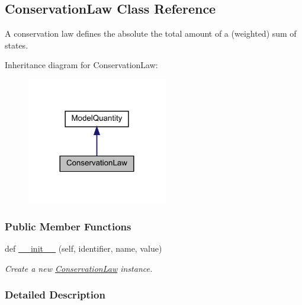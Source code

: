 \hypertarget{classamici_1_1ode__export_1_1_conservation_law}{}\subsection{Conservation\+Law Class Reference}
\label{classamici_1_1ode__export_1_1_conservation_law}


A conservation law defines the absolute the total amount of a (weighted) sum of states.  




Inheritance diagram for Conservation\+Law\+:
\nopagebreak
\begin{figure}[H]
\begin{center}
\leavevmode
\includegraphics[width=173pt]{classamici_1_1ode__export_1_1_conservation_law__inherit__graph}
\end{center}
\end{figure}
\subsubsection*{Public Member Functions}
\begin{DoxyCompactItemize}
\item 
def \mbox{\hyperlink{classamici_1_1ode__export_1_1_conservation_law_a258843a3afab00b576ccf386e8673a64}{\+\_\+\+\_\+init\+\_\+\+\_\+}} (self, identifier, name, value)
\begin{DoxyCompactList}\small\item\em Create a new \mbox{\hyperlink{classamici_1_1ode__export_1_1_conservation_law}{Conservation\+Law}} instance. \end{DoxyCompactList}\end{DoxyCompactItemize}


\subsubsection{Detailed Description}


